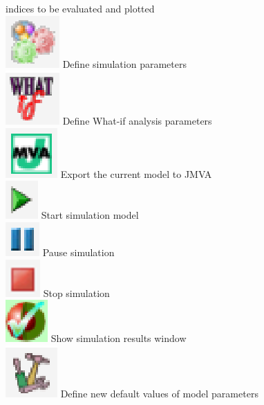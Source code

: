 indices to be evaluated and plotted\\
\includegraphics[scale=.5]{img/jsimg/defineSimulationParameters.eps} Define simulation
parameters\\
\includegraphics[scale=.5]{img/jsimg/whatIf} Define What-if analysis
parameters\\
\includegraphics[scale=.5]{img/jsimg/exportToJMVA} Export the current model to
JMVA\\
\includegraphics[scale=.5]{img/jsimg/play} Start simulation
model\\
\includegraphics[scale=.5]{img/jsimg/pause} Pause simulation\\
\includegraphics[scale=.5]{img/jsimg/stop}
Stop simulation\\
\includegraphics[scale=.5]{img/jsimg/showResultsWindow} Show simulation results
window\\
\includegraphics[scale=.5]{img/jsimg/defineDefaults} Define new default values of model
parameters\\

